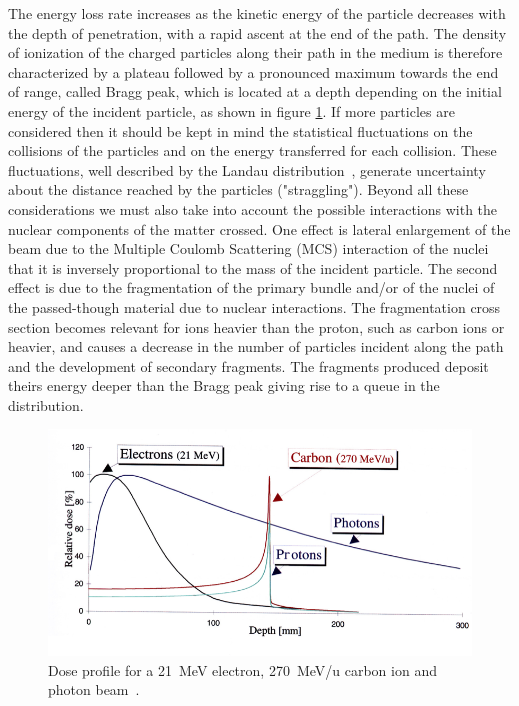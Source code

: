 The energy loss rate increases as the kinetic energy of the particle decreases with the depth of penetration, with a rapid ascent at the end of the path.
The density of ionization of the charged particles along their path in the medium is therefore characterized by a plateau followed by a pronounced maximum towards the end of range, called Bragg peak, which is located at a depth depending on the initial energy of the incident particle, as shown in figure \ref{fig:braggpeak}.
\newline
If more particles are considered then it should be kept in mind
the statistical fluctuations on the collisions of the particles and on the energy transferred for each collision.
These fluctuations, well described by the Landau distribution~\cite{landau}, generate uncertainty about the distance reached by the particles ("straggling").
Beyond all these considerations we must also take into account the possible interactions with the nuclear components of the matter crossed.
One effect is lateral enlargement of the beam due to the Multiple Coulomb Scattering (MCS) interaction of the nuclei that it is inversely proportional to the mass of the incident particle.
The second effect is due to the fragmentation of the primary bundle and/or of the nuclei of the passed-though material due to nuclear interactions.
The fragmentation cross section becomes relevant for ions heavier than the proton, such as carbon ions or heavier, and causes a decrease in the number of particles incident along the path and the development of secondary fragments.
The fragments produced deposit theirs energy deeper than the Bragg peak giving rise to a queue in the distribution.
\begin{figure}[H]
	\centering
	\includegraphics[width=0.8\linewidth]{IMG/ch1/BraggPeak2}
	\caption{Dose profile for a 21~MeV electron, 270~MeV/u carbon ion and photon beam~\cite{bragg}.}
	\label{fig:braggpeak}
\end{figure}  


